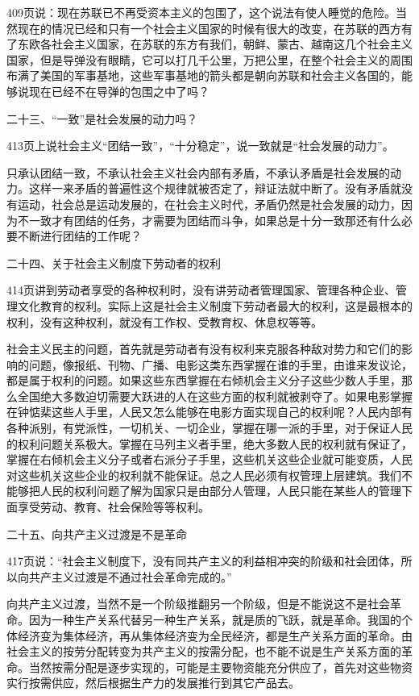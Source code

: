 409页说：现在苏联已不再受资本主义的包围了，这个说法有使人睡觉的危险。当然现在的情况已经和只有一个社会主义国家的时候有很大的改变，在苏联的西方有了东欧各社会主义国家，在苏联的东方有我们，朝鲜、蒙古、越南这几个社会主义国家，但是导弹没有眼睛，它可以打几千公里，万把公里，在整个社会主义的周围布满了美国的军事基地，这些军事基地的箭头都是朝向苏联和社会主义各国的，能够说现在已经不在导弹的包围之中了吗？

二十三、“一致”是社会发展的动力吗？

413页上说社会主义“团结一致”，“十分稳定”，说一致就是“社会发展的动力”。

只承认团结一致，不承认社会主义社会内部有矛盾，不承认矛盾是社会发展的动力。这样一来矛盾的普遍性这个规律就被否定了，辩证法就中断了。没有矛盾就没有运动，社会总是运动发展的，在社会主义时代，矛盾仍然是社会发展的动力，因为不一致才有团结的任务，才需要为团结而斗争，如果总是十分一致那还有什么必要不断进行团结的工作呢？

二十四、关于社会主义制度下劳动者的权利

414页讲到劳动者享受的各种权利时，没有讲劳动者管理国家、管理各种企业、管理文化教育的权利。实际上这是社会主义制度下劳动者最大的权利，这是最根本的权利，没有这种权利，就没有工作权、受教育权、休息权等等。

社会主义民主的问题，首先就是劳动者有没有权利来克服各种敌对势力和它们的影响的问题，像报纸、刊物、广播、电影这类东西掌握在谁的手里，由谁来发议论，都是属于权利的问题。如果这些东西掌握在右倾机会主义分子这些少数人手里，那么全国绝大多数迫切需要大跃进的人在这些方面的权利就被剥夺了。如果电影掌握在钟惦棐这些人手里，人民又怎么能够在电影方面实现自己的权利呢？人民内部有各种派别，有党派性，一切机关、一切企业，掌握在哪一派的手里，对于保证人民的权利问题关系极大。掌握在马列主义者手里，绝大多数人民的权利就有保证了，掌握在右倾机会主义分子或者右派分子手里，这些机关这些企业就可能变质，人民对这些机关这些企业的权利就不能保证。总之人民必须有权管理上层建筑。我们不能够把人民的权利问题了解为国家只是由部分人管理，人民只能在某些人的管理下面享受劳动、教育、社会保险等等权利。

二十五、向共产主义过渡是不是革命

417页说：“社会主义制度下，没有同共产主义的利益相冲突的阶级和社会团体，所以向共产主义过渡是不通过社会革命完成的。”

向共产主义过渡，当然不是一个阶级推翻另一个阶级，但是不能说这不是社会革命。因为一种生产关系代替另一种生产关系，就是质的飞跃，就是革命。我国的个体经济变为集体经济，再从集体经济变为全民经济，都是生产关系方面的革命。由社会主义的按劳分配转变为共产主义的按需分配，也不能不说是生产关系方面的革命。当然按需分配是逐步实现的，可能是主要物资能充分供应了，首先对这些物资实行按需供应，然后根据生产力的发展推行到其它产品去。

